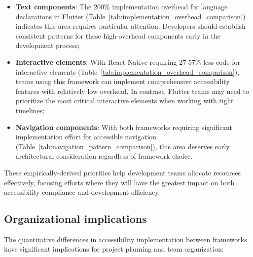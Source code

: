 \begin{itemize}
    \item \textbf{Text components}: The 200\% implementation overhead for language declarations in Flutter (Table~\ref{tab:implementation_overhead_comparison}) indicates this area requires particular attention. Developers should establish consistent patterns for these high-overhead components early in the development process;

    \item \textbf{Interactive elements}: With React Native requiring 27-57\% less code for interactive elements (Table~\ref{tab:implementation_overhead_comparison}), teams using this framework can implement comprehensive accessibility features with relatively low overhead. In contrast, Flutter teams may need to prioritize the most critical interactive elements when working with tight timelines;

    \item \textbf{Navigation components}: With both frameworks requiring significant implementation effort for accessible navigation (Table~\ref{tab:navigation_pattern_comparison}), this area deserves early architectural consideration regardless of framework choice.
\end{itemize}

These empirically-derived priorities help development teams allocate resources effectively, focusing efforts where they will have the greatest impact on both accessibility compliance and development efficiency.

\subsection{Organizational implications}
\label{subsec:implications-organizational}

The quantitative differences in accessibility implementation between frameworks have significant implications for project planning and team organization:

